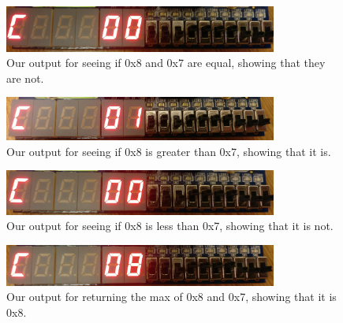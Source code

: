 \documentclass[11pt]{article}
\begin{document}
\begin{figure}[H]
    \centering
    \includegraphics[width=0.8\textwidth]{C1}
    \caption{Our output for seeing if 0x8 and 0x7 are equal, showing that they are not.}
\end{figure}
\begin{figure}[H]
    \centering
    \includegraphics[width=0.8\textwidth]{C2}
    \caption{Our output for seeing if 0x8 is greater than 0x7, showing that it is.}
\end{figure}
\begin{figure}[H]
    \centering
    \includegraphics[width=0.8\textwidth]{C3}
    \caption{Our output for seeing if 0x8 is less than 0x7, showing that it is not.}
\end{figure}
\begin{figure}[H]
    \centering
    \includegraphics[width=0.8\textwidth]{C4}
    \caption{Our output for returning the max of 0x8 and 0x7, showing that it is 0x8.}
\end{figure}
\end{document}
